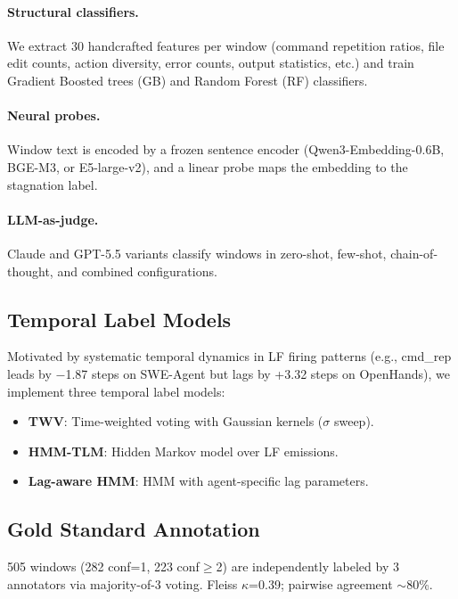 \documentclass[11pt,a4paper]{article}
\begin{document}
\paragraph{Structural classifiers.}
We extract 30 handcrafted features per window (command repetition ratios, file edit counts, action diversity, error counts, output statistics, etc.) and train Gradient Boosted trees (GB) and Random Forest (RF) classifiers.

\paragraph{Neural probes.}
Window text is encoded by a frozen sentence encoder (Qwen3-Embedding-0.6B, BGE-M3, or E5-large-v2), and a linear probe maps the embedding to the stagnation label.

\paragraph{LLM-as-judge.}
Claude and GPT-5.5 variants classify windows in zero-shot, few-shot, chain-of-thought, and combined configurations.

\subsection{Temporal Label Models}

Motivated by systematic temporal dynamics in LF firing patterns (e.g., cmd\_rep leads by $-$1.87 steps on SWE-Agent but lags by +3.32 steps on OpenHands), we implement three temporal label models:
\begin{itemize}
    \item \textbf{TWV}: Time-weighted voting with Gaussian kernels ($\sigma$ sweep).
    \item \textbf{HMM-TLM}: Hidden Markov model over LF emissions.
    \item \textbf{Lag-aware HMM}: HMM with agent-specific lag parameters.
\end{itemize}

\subsection{Gold Standard Annotation}

505 windows (282 conf=1, 223 conf$\geq$2) are independently labeled by 3 annotators via majority-of-3 voting.
Fleiss $\kappa$=0.39; pairwise agreement $\sim$80\%.

\end{document}
